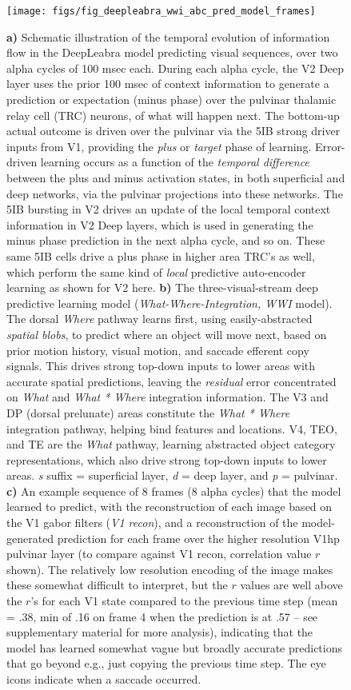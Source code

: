 \documentclass[12pt,twoside]{article}
\newif\myifpdf
\begin{document}
\begin{figure}
  \centering\texttt{[image: figs/fig\_deepleabra\_wwi\_abc\_pred\_model\_frames]}
  \caption{\small {\bf a)} Schematic illustration of the temporal evolution of information flow in the DeepLeabra model predicting visual sequences, over two alpha cycles of 100 msec each.  During each alpha cycle, the V2 Deep layer uses the prior 100 msec of context information to generate a prediction or expectation (minus phase) over the pulvinar thalamic relay cell (TRC) neurons, of what will happen next.  The bottom-up actual outcome is driven over the pulvinar via the 5IB strong driver inputs from V1, providing the {\em plus} or {\em target} phase of learning.  Error-driven learning occurs as a function of the {\em temporal difference} between the plus and minus activation states, in both superficial and deep networks, via the pulvinar projections into these networks.  The 5IB bursting in V2 drives an update of the local temporal context information in V2 Deep layers, which is used in generating the minus phase prediction in the next alpha cycle, and so on.  These same 5IB cells drive a plus phase in higher area TRC's as well, which perform the same kind of {\em local} predictive auto-encoder learning as shown for V2 here.  {\bf b)} The three-visual-stream deep predictive learning model ({\em What-Where-Integration, WWI} model). The dorsal {\em Where} pathway learns first, using easily-abstracted {\em spatial blobs}, to predict where an object will move next, based on prior motion history, visual motion, and saccade efferent copy signals.  This drives strong top-down inputs to lower areas with accurate spatial predictions, leaving the {\em residual} error concentrated on {\em What} and {\em What * Where} integration information.  The V3 and DP (dorsal prelunate) areas constitute the {\em What * Where} integration pathway, helping bind features and locations.  V4, TEO, and TE are the {\em What} pathway, learning abstracted object category representations, which also drive strong top-down inputs to lower areas.  {\em s} suffix = superficial layer, {\em d} = deep layer, and {\em p} = pulvinar. {\bf c)} An example sequence of 8 frames (8 alpha cycles) that the model learned to predict, with the reconstruction of each image based on the V1 gabor filters ({\em V1 recon}), and a reconstruction of the model-generated prediction for each frame over the higher resolution V1hp pulvinar layer (to compare against V1 recon, correlation value $r$ shown).  The relatively low resolution encoding of the image makes these somewhat difficult to interpret, but the $r$ values are well above the $r$'s for each V1 state compared to the previous time step (mean = .38, min of .16 on frame 4 when the prediction is at .57 -- see supplementary material for more analysis), indicating that the model has learned somewhat vague but broadly accurate predictions that go beyond e.g., just copying the previous time step.  The eye icons indicate when a saccade occurred.}
  \label{fig.model}
\end{figure}
\end{document}
